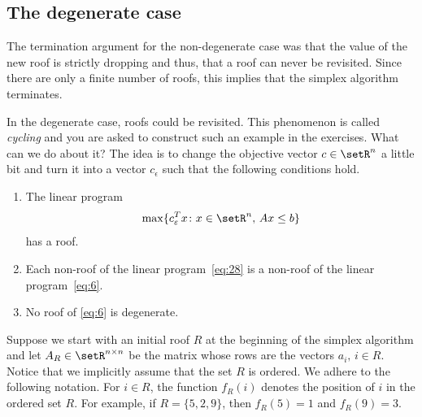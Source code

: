 






 \subsection{The degenerate case}
 \label{sec:degenerate-case}

 The termination argument for the non-degenerate case was that the
 value of the new roof  is strictly dropping and thus, that a
 roof can never be revisited. Since there are only a finite number
 of roofs, this implies that the simplex algorithm terminates.

 In the degenerate case, roofs could be revisited. This phenomenon
 is called \emph{cycling} and you are asked to construct such an
 example in the exercises. What can we do about it? The idea is  to change the
 objective vector $c \in \setR^n$ a little bit and turn it into a vector
 $c_\epsilon$ such that the following conditions hold. 

 \begin{enumerate}[1)]
 \item The linear program  
   \begin{equation}
     \label{eq:6}
      \max\{c_\varepsilon^Tx \colon  x \in  \setR^n, \, Ax \leq b\}
   \end{equation}
   has a roof.\label{xitem:19}
 \item Each non-roof of the linear program~\eqref{eq:28}  is a non-roof  of the
   linear program~\eqref{eq:6}. \label{xitem:18}  
 \item No roof of \eqref{eq:6} is degenerate. \label{xitem:20}
 \end{enumerate}


 Suppose we start with  an initial roof 
 $R$ at the beginning of the
 simplex algorithm and let ${A_R}\in \setR^{n\times n}$ be the matrix whose
 rows  are the vectors $a_i, \, i \in R$. 
 Notice that we implicitly assume that the set $R$ is ordered. We
 adhere to the following notation. For $i \in R$, the function $f_R(i)$
 denotes the position of $i$ in the ordered set $R$. For example, if
 $R = \{5,2,9\}$, then $f_R(5)=1$ and $f_R(9)=3$. 


